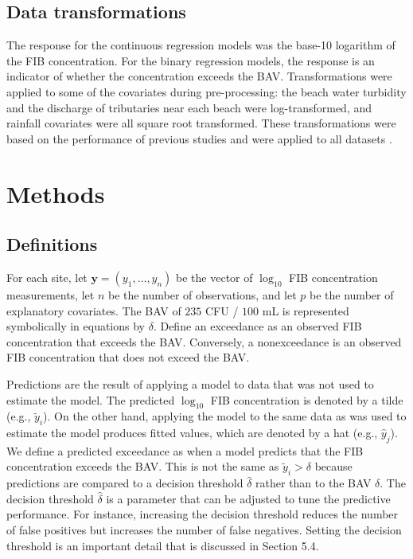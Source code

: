 \documentclass[authoryear,review, 12pt]{elsarticle}
\begin{document}
\subsection{Data transformations}\label{data-transformations}

The response for the continuous regression models was the base-10
logarithm of the FIB concentration. For the binary regression models,
the response is an indicator of whether the concentration exceeds the
BAV. Transformations were applied to some of the covariates during
pre-processing: the beach water turbidity and the discharge of
tributaries near each beach were log-transformed, and rainfall
covariates were all square root transformed. These transformations were
based on the performance of previous studies and were applied to all
datasets \citep{Ge:2007ou,Frick:2008jo}.

\section{Methods}\label{methods}

\subsection{Definitions}\label{definitions}

For each site, let \(\bm{y}=(y_1, \dots, y_n)\) be the vector of
\(\log_{10}\) FIB concentration measurements, let \(n\) be the number of
observations, and let \(p\) be the number of explanatory covariates. The
BAV of \(235\) CFU / \(100\) mL is represented
symbolically in equations by \(\delta\). Define an exceedance as an observed FIB concentration that exceeds the BAV. Conversely, a
nonexceedance is an observed FIB concentration that does not exceed the
BAV.

Predictions are the result of applying a model to data that was not used
to estimate the model. The predicted \(\log_{10}\) FIB concentration is
denoted by a tilde (e.g., \(\tilde{y}_i\)). On the other hand, applying
the model to the same data as was used to estimate the model produces
fitted values, which are denoted by a hat (e.g., \(\hat{y}_j\)). We
define a predicted exceedance as when a model predicts that the FIB
concentration exceeds the BAV. This is not the same as
\(\tilde{y}_i > \delta\) because predictions are compared to a decision
threshold \(\hat{\delta}\) rather than to the BAV \(\delta\). The
decision threshold \(\hat{\delta}\) is a parameter that can be adjusted
to tune the predictive performance. For instance, increasing the
decision threshold reduces the number of false positives but increases
the number of false negatives. Setting the decision threshold is an
important detail that is discussed in Section 5.4.
\end{document}
